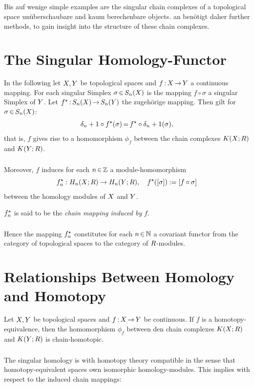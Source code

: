 \documentclass[11pt,twoside]{article}
\def\Rand#1{\delta_#1}
\begin{document}
\subparagraph{}
Bis auf wenige simple examples are the singular chain complexes of a
topological space un\"uberschaubare and kaum berechenbare objects.
an ben\"otigt daher further methods,
to gain insight into the structure of these chain complexes.

\section{The Singular Homology-Functor}
In the following let $X,Y$ be topological spaces and
$f {\,:\,} X {\,\to\,} Y$ a continuous mapping.
For each singular Simplex $\sigma {\,\in\,} S_n(X)$ is the mapping
$f \circ \sigma$ a singular Simplex of $Y$.
Let $f^{\star} {\,:\,} S_n(X) {\,\to\,} S_n(Y)$ the zugeh\"orige mapping.
Then gilt for $\sigma {\,\in\,} S_n(X)$:
\[
\Rand{n+1} \circ f^{\*}(\sigma) \eq f^{\*} \circ \Rand{n+1} (\sigma),
\]
that is,
$f$ gives rise to a homomorphism $\phi_f$
between the chain complexes $K(X;R)$ and $K(Y;R)$.

\subparagraph{}
Moreover,
$f$ induces for each $n {\,\in\,} {\mathbb{Z}}$ a module-homomorphism
\[
f^{\star}_n : H_n(X;R) \to H_n(Y;R),
\quad
f^{\star}([\sigma]) := [f \circ \sigma]
\]
between the homology modules of $X$ and $Y$.

\begin{definition}
$f^{\star}_n$ is said to be the \textit{chain mapping induced by} $f$.
\end{definition}

\subparagraph{}
Hence the mapping $f^{\star}_n$ constitutes for each $n {\,\in\,} {\mathbb{N}}$
a covariant functor from the category of topological spaces
to the category of $R$-modules.

\section{Relationships Between Homology and Homotopy}
Let $X,Y$ be topological spaces and $f{\,:\,}X {\,\to\,} Y$ be continuous.
If $f$ is a homotopy-equivalence,
then the homomorphism $\phi_f$ between den chain complexes
$K(X;R)$ and $K(Y;R)$ is chain-homotopic.

\subparagraph{}
The singular homology is with homotopy theory compatible in the sense
that homotopy-equivalent spaces own isomorphic homology-modules.
This implies with respect to the induced chain mappings:
\end{document}
